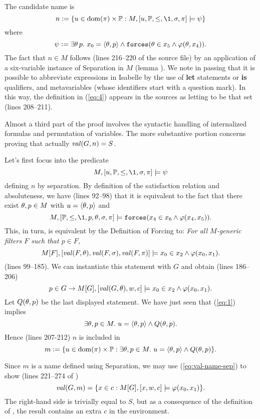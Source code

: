 The candidate name is
\begin{equation}\label{eq:4}
n \defi \{u \in\dom(\pi)\times\PP :M,[u,\PP,\leq,\1,\sig,\pi]\models \psi\}
\end{equation}
where
\[
\psi \mathrel{\mathop:}= \exists \theta\, p.\ x_0=\langle\theta,p\rangle \wedge 
   \mathop{\mathtt{forces}}(\theta\in x_5\wedge\varphi(\theta,x_4)).
\]
The fact that $n\in M$ follows (lines 216--220 of the source file) by
an application of a six-variable instance of Separation in $M$ (lemma
). We note in
passing that it is possible to  abbreviate expressions in Isabelle by
the use of \textbf{let} statements or  \textbf{is} qualifiers,
and metavariables (whose
identifiers start with a question mark). In this way, the definition in
(\ref{eq:4}) appears in the sources as letting  to be that
set (lines 208--211).

Almost a third part of the proof involves the syntactic handling of
internalized formulas and permutation of variables. The more
substantive portion concerns proving that actually $\operatorname{\mathit{val}}(G,n)=S$.

Let's first focus into the predicate 
\begin{equation}\label{eq:1}
M,[u,\PP,\leq,\1,\sig,\pi]\models \psi
\end{equation}
defining $n$ by separation. By definition of the satisfaction
relation and %
absoluteness, we have (lines 92--98) that it is equivalent to the fact
that there exist $\theta,p\in M$ with   $u=\langle\theta,p\rangle$  and 
\[
M,[\PP,\leq,\1,p,\th,\sig,\pi]\models \forceisa(x_4\in
x_6\y\phi(x_4,x_5)). 
\]
This, in turn, is equivalent by the Definition of Forcing to: \emph{For all $M$-generic
filters $F$ such that $p\in F$,} 
\begin{equation}\label{eq:2}
M[F],[\val(F,\th),\val(F,\sig),\val(F,\pi)]\models x_0\in
x_2\y\phi(x_0,x_1). 
\end{equation}
(lines 99--185). We can instantiate this statement with $G$ and obtain
(lines 186--206)
\[
p\in G \rightarrow M[G],[\operatorname{\mathit{val}}(G,\theta),w,c]\models x_0\in
x_2\wedge\varphi(x_0,x_1). 
\] 
Let $Q(\theta,p)$ be the last displayed statement. We have just seen that
(\ref{eq:1}) implies 
\[
\exists \theta,p\in M.\ u=\langle\theta,p\rangle \wedge Q(\theta,p).
\]
Hence (lines 207-212) $n$ is included in 
\[
m\mathrel{\mathop:}= \{u \in\operatorname{dom}(\pi)\times\mathbb{P} : \exists \theta,p\in M.\ u=\langle\theta,p\rangle
\wedge Q(\theta,p)\}. 
\]

Since $m$ is a name defined using Separation, we may use
(\ref{eq:val-name-sep}) to show (lines 221--274 of
)
\begin{equation}
  \label{eq:val-of-m}
  \val(G,m) = \{x\in c : M[G],[x,w,c]\models \phi(x_0,x_1)\}.
\end{equation}
The right-hand side is trivially equal to $S$, but as a consequence of
the definition of 
, the result contains an extra $c$ in the
environment.

